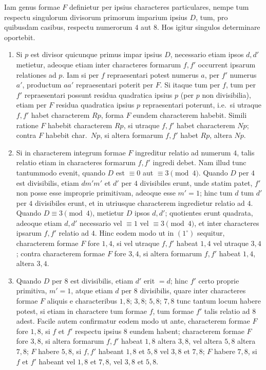 \documentclass[12pt,a4paper]{article}
\theoremstyle{plain}
\theoremstyle{definition}
\theoremstyle{remark}
\theoremstyle{problemstyle}
\begin{document}
Iam genus formae $F$ definietur per ipsius characteres particulares, nempe tum respectu singulorum divisorum primorum imparium ipsius $D$, tum, pro quibusdam casibus, respectu numerorum $4$ aut $8$. Hos igitur singulos determinare oportebit.

\begin{enumerate}[label=$\arabic*^{\circ}$.]
\item Si $p$ est divisor quicunque primus impar ipsius $D$, necessario etiam ipsos $d, d'$ metietur, adeoque etiam inter characteres formarum $f, f'$ occurrent ipsarum relationes ad $p$. Iam si per $f$ repraesentari potest numerus $a$, per $f'$ numerus $a'$, productum $aa'$ repraesentari poterit per $F$. Si itaque tum per $f$, tum per $f'$ repraesentari possunt residua quadratica ipsius $p$ (per $p$ non divisibilia), etiam per $F$ residua quadratica ipsius $p$ repraesentari poterunt, i.e.\ si utraque $f, f'$ habet characterem $Rp$, forma $F$ eundem characterem habebit. Simili ratione $F$ habebit characterem $Rp$, si utraque $f, f'$ habet characterem $Np$; contra $F$ habebit char.\ $Np$, si altera formarum $f, f'$ habet $Rp$, altera $Np$.

\item Si in characterem integrum formae $F$ ingreditur relatio ad numerum $4$, talis relatio etiam in characteres formarum $f, f'$ ingredi debet. Nam illud tunc tantummodo evenit, quando $D$ est $\equiv 0$ aut $\equiv 3 \pmod{4}$. Quando $D$ per $4$ est divisibilis, etiam $dm'm'$ et $d'$ per $4$ divisibiles erunt, unde statim patet, $f'$ non posse esse improprie primitivam, adeoque esse $m' = 1$; hinc tum $d$ tum $d'$ per $4$ divisibiles erunt, et in utriusque characterem ingredietur relatio ad $4$. Quando $D \equiv 3 \pmod{4}$, metietur $D$ ipsos $d, d'$; quotientes erunt quadrata, adeoque etiam $d, d'$ necessario vel $\equiv 1$ vel $\equiv 3 \pmod{4}$, et inter characteres ipsarum $f, f'$ relatio ad $4$. Hinc eodem modo ut in $(1^{\circ})$ sequitur, characterem formae $F$ fore $1,4$, si vel utraque $f, f'$ habeat $1,4$ vel utraque $3,4$; contra characterem formae $F$ fore $3,4$, si altera formarum $f, f'$ habeat $1,4$, altera $3,4$.

\item Quando $D$ per $8$ est divisibilis, etiam $d'$ erit $= d$; hinc $f'$ certo proprie primitiva, $m' = 1$, atque etiam $d$ per $8$ divisibilis, quare inter characteres formae $F$ aliquis e characteribus $1,8$; $3,8$; $5,8$; $7,8$ tunc tantum locum habere potest, si etiam in charactere tum formae $f$, tum formae $f'$ talis relatio ad $8$ adest. Facile autem confirmatur eodem modo ut ante, characterem formae $F$ fore $1,8$, si $f$ et $f'$ respectu ipsius $8$ eundem habent; characterem formae $F$ fore $3,8$, si altera formarum $f, f'$ habeat $1,8$ altera $3,8$, vel altera $5,8$ altera $7,8$; $F$ habere $5,8$, si $f, f'$ habeant $1,8$ et $5,8$ vel $3,8$ et $7,8$; $F$ habere $7,8$, si $f$ et $f'$ habeant vel $1,8$ et $7,8$, vel $3,8$ et $5,8$.


\end{enumerate}
\end{document}
